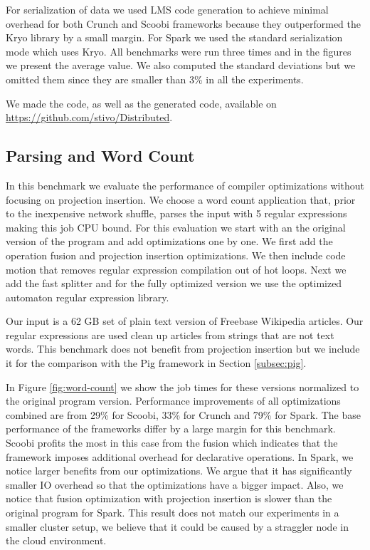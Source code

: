 For serialization of data we used LMS code generation to achieve minimal overhead for both Crunch and Scoobi frameworks because they outperformed the Kryo \cite{ kryo} library by a small margin. For Spark we used the standard serialization mode which uses Kryo. All benchmarks were run three times and in the figures we present the average value. We also computed the standard deviations but we omitted them since they are smaller than 3\% in all the experiments.

We made the \tool code, as well as the generated code, available on \url{https://github.com/stivo/Distributed}.


\subsection{Parsing and Word Count}
\label{subsec:parsing-word-count}

In this benchmark we evaluate the performance of \tool compiler optimizations
without focusing on projection insertion. We choose a word count application
that, prior to the inexpensive network shuffle, parses the input with 5 regular
expressions making this job CPU bound. For this evaluation we start with an the
original version of the program and add optimizations one by one. We first add
the operation fusion and projection insertion optimizations. We then include
code motion that removes regular expression compilation out of hot loops. Next
we add the fast splitter and for the fully optimized version we use the
optimized automaton regular expression library.

Our input is a 62 GB set of plain text version of Freebase Wikipedia articles.
Our regular expressions are used clean up articles from strings that are not
text words. This benchmark does not benefit from projection insertion but we
include it for the comparison with the Pig framework in Section
\ref{subsec:pig}.

In Figure \ref{fig:word-count} we show the job times for these versions
normalized to the original program version. Performance improvements of all
optimizations combined are from 29\% for Scoobi, 33\% for Crunch and 79\% for
Spark. The base performance of the frameworks differ by a large margin for this
benchmark. Scoobi profits the most in this case from the fusion which indicates
that the framework imposes additional overhead for declarative operations. In
Spark, we notice larger benefits from our optimizations. We argue that it has
significantly smaller IO overhead so that the optimizations have a bigger
impact. Also, we notice that fusion optimization with projection insertion is
slower than the original program for Spark. This result does not match our
experiments in a smaller cluster setup, we believe that it could be caused by a
straggler node in the cloud environment.

